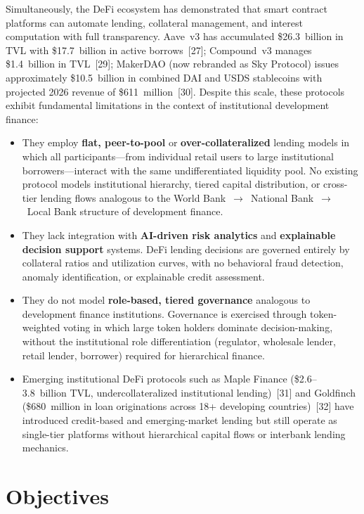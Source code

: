 \documentclass[12pt,a4paper]{report}
\begin{document}
Simultaneously, the DeFi ecosystem has demonstrated that smart contract platforms can automate lending, collateral management, and interest computation with full transparency. Aave~v3 has accumulated \$26.3~billion in TVL with \$17.7~billion in active borrows~[27]; Compound~v3 manages \$1.4~billion in TVL~[29]; MakerDAO (now rebranded as Sky Protocol) issues approximately \$10.5~billion in combined DAI and USDS stablecoins with projected 2026 revenue of \$611~million~[30]. Despite this scale, these protocols exhibit fundamental limitations in the context of institutional development finance:

\begin{itemize}[noitemsep]
\item They employ \textbf{flat, peer-to-pool} or \textbf{over-collateralized} lending models in which all participants---from individual retail users to large institutional borrowers---interact with the same undifferentiated liquidity pool. No existing protocol models institutional hierarchy, tiered capital distribution, or cross-tier lending flows analogous to the World Bank~$\to$~National Bank~$\to$~Local Bank structure of development finance.
\item They lack integration with \textbf{AI-driven risk analytics} and \textbf{explainable decision support} systems. DeFi lending decisions are governed entirely by collateral ratios and utilization curves, with no behavioral fraud detection, anomaly identification, or explainable credit assessment.
\item They do not model \textbf{role-based, tiered governance} analogous to development finance institutions. Governance is exercised through token-weighted voting in which large token holders dominate decision-making, without the institutional role differentiation (regulator, wholesale lender, retail lender, borrower) required for hierarchical finance.
\item Emerging institutional DeFi protocols such as Maple Finance (\$2.6--3.8~billion TVL, undercollateralized institutional lending)~[31] and Goldfinch (\$680~million in loan originations across 18+ developing countries)~[32] have introduced credit-based and emerging-market lending but still operate as single-tier platforms without hierarchical capital flows or interbank lending mechanics.
\end{itemize}

\section{Objectives}
\end{document}
